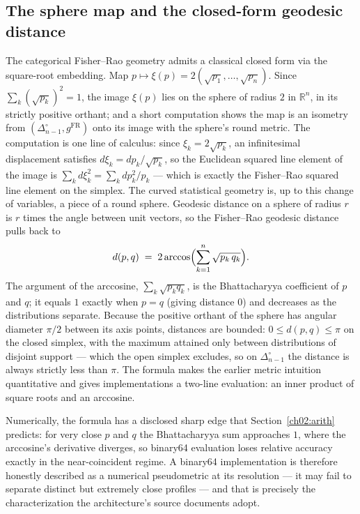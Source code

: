 \subsection{The sphere map and the closed-form geodesic distance}\label{ch02:infogeo:geodesic}

The categorical Fisher--Rao geometry admits a classical closed form via
the square-root embedding. Map $p\mapsto \xi(p) =
2(\sqrt{p_1},\dots,\sqrt{p_n})$. Since $\sum_k(\sqrt{p_k})^2=1$, the
image $\xi(p)$ lies on the sphere of radius $2$ in $\mathbb{R}^n$, in
its strictly positive orthant; and a short computation shows the map is
an isometry from $(\Delta_{n-1}^{\circ}, g^{\mathrm{FR}})$ onto its
image with the sphere's round metric. The computation is one line of
calculus: since $\xi_k = 2\sqrt{p_k}$, an infinitesimal displacement
satisfies $d\xi_k = dp_k/\sqrt{p_k}$, so the Euclidean squared line
element of the image is
$\sum_k d\xi_k^2 = \sum_k dp_k^2/p_k$ --- which is exactly the
Fisher--Rao squared line element on the simplex. The curved statistical
geometry is, up to this change of variables, a piece of a round sphere. Geodesic distance on a sphere of
radius $r$ is $r$ times the angle between unit vectors, so the
Fisher--Rao geodesic distance pulls back to
\[
d(p,q)\;=\;2\arccos\Bigl(\sum_{k=1}^{n}\sqrt{p_k\,q_k}\Bigr).
\]
The argument of the arccosine, $\sum_k\sqrt{p_k q_k}$, is the
Bhattacharyya coefficient of $p$ and $q$; it equals $1$ exactly when
$p=q$ (giving distance $0$) and decreases as the distributions
separate. Because the positive orthant of the sphere has angular
diameter $\pi/2$ between its axis points, distances are bounded:
$0\le d(p,q)\le \pi$ on the closed simplex, with the maximum attained
only between distributions of disjoint support --- which the open
simplex excludes, so on $\Delta_{n-1}^{\circ}$ the distance is always
strictly less than $\pi$. The formula makes the earlier metric intuition
quantitative and gives implementations a two-line evaluation: an inner
product of square roots and an arccosine.

Numerically, the formula has a disclosed sharp edge that
Section~\ref{ch02:arith} predicts: for very close $p$ and $q$ the
Bhattacharyya sum approaches $1$, where the arccosine's derivative
diverges, so binary64 evaluation loses relative accuracy exactly in the
near-coincident regime. A binary64 implementation is therefore honestly
described as a numerical pseudometric at its resolution --- it may fail
to separate distinct but extremely close profiles --- and that is
precisely the characterization the architecture's source documents
adopt.

